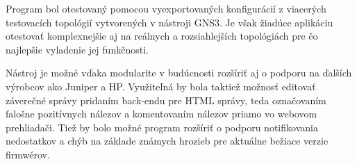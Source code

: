 Program bol otestovaný pomocou vyexportovaných konfigurácií z viacerých testovacích topológií vytvorených v nástroji GNS3. Je však žiadúce aplikáciu otestovať komplexnejšie aj na reálnych a rozsiahlejších topológiách pre čo najlepšie vyladenie jej funkčnosti. 

Nástroj je možné vďaka modularite v budúcnosti rozšíriť aj o podporu na ďalších výrobcov ako Juniper a HP. Využiteľná by bola taktiež možnosť editovať záverečné správy pridaním back-endu pre HTML správy, teda označovaním falošne pozitívnych nálezov a komentovaním nálezov priamo vo webovom prehliadači. Tiež by bolo možné program rozšíriť o podporu notifikovania nedostatkov a chýb na základe známych hrozieb pre aktuálne bežiace verzie firmwérov.
